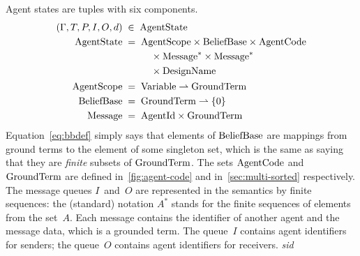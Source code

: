 \documentclass[a4paper,12pt,oneside,fleqn]{book} %
\newcommand{\pmap}{\rightharpoonup}
\begin{document}
Agent states are tuples with six components.
\begin{align}
(\Gamma, T, P, I, O,d) &\;\in\; {\rm AgentState}
\\
{\rm AgentState} &\;=\;
  \begin{aligned}[t]
    &{\rm AgentScope} \times{\rm BeliefBase} \times{\rm AgentCode} \\
    &\quad\times{\rm Message}^* \times{\rm Message}^* \\
    &\quad\times{\rm DesignName}
  \end{aligned}
\\
{\rm AgentScope} &\;=\; {\rm Variable}\pmap{\rm GroundTerm}
\\
{\rm BeliefBase} &\;=\; {\rm GroundTerm}\pmap\{0\} \label{eq:bbdef}
\\
{\rm Message} &\;=\; {\rm AgentId}\times{\rm GroundTerm}
\end{align}
Equation~\eqref{eq:bbdef} simply says that elements of ${\rm BeliefBase}$
are mappings from ground terms to the element of some singleton set, which
is the same as saying that they are \emph{finite} subsets of ${\rm
GroundTerm}$. The sets ${\rm AgentCode}$ and ${\rm GroundTerm}$ are defined
in~\autoref{fig:agent-code} and in~\autoref{sec:multi-sorted} respectively.
The message queues $I$~and~$O$ are represented in the semantics by finite
sequences: the (standard) notation $A^*$ stands for the finite sequences of
elements from the set~$A$. Each message contains the identifier of another
agent and the message data, which is a grounded term. The queue~$I$
contains agent identifiers for senders; the queue~$O$ contains agent
identifiers for receivers.
{\it sid}
\end{document}
